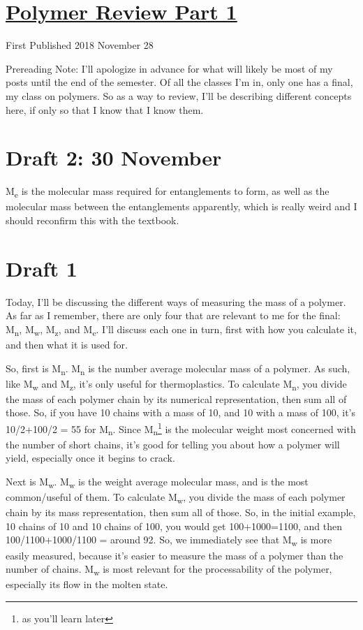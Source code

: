 \documentclass[12pt]{article}[titlepage]
\newcommand{\1}{\={a}}
\newcommand{\2}{\={e}}
\newcommand{\3}{\={\i}}
\newcommand{\4}{\=o}
\newcommand{\5}{\=u}
\newcommand{\6}{\={A}}
\newcommand{\sub}[1]{\textsubscript{#1}}
\renewcommand{\,}{\textsuperscript{,}}
\begin{document}
\doublespacing
\section{\href{polymer-1.html}{Polymer Review Part 1}}
First Published 2018 November 28

Prereading Note: I'll apologize in advance for what will likely be most of my posts until the end of the semester.
Of all the classes I'm in, only one has a final, my class on polymers.
So as a way to review, I'll be describing different concepts here, if only so that I know that I know them.
\section{Draft 2: 30 November}
M\sub{e} is the molecular mass required for entanglements to form, as well as the molecular mass between the entanglements apparently, which is really weird and I should reconfirm this with the textbook.
\section{Draft 1}
Today, I'll be discussing the different ways of measuring the mass of a polymer.
As far as I remember, there are only four that are relevant to me for the final: M\sub{n}, M\sub{w}, M\sub{z}, and M\sub{e}.
I'll discuss each one in turn, first with how you calculate it, and then what it is used for.

So, first is M\sub{n}.
M\sub{n} is the number average molecular mass of a polymer.
As such, like M\sub{w} and M\sub{z}, it's only useful for thermoplastics.
To calculate M\sub{n}, you divide the mass of each polymer chain by its numerical representation, then sum all of those.
So, if you have 10 chains with a mass of 10, and 10 with a mass of 100, it's 10/2+100/2 = 55 for M\sub{n}.
Since M\sub{n}\footnote{as you'll learn later} is the molecular weight most concerned with the number of short chains, it's good for telling you about how a polymer will yield, especially once it begins to crack.

Next is M\sub{w}.
M\sub{w} is the weight average molecular mass, and is the most common/useful of them.
To calculate M\sub{w}, you divide the mass of each polymer chain by its mass representation, then sum all of those.
So, in the initial example, 10 chains of 10 and 10 chains of 100, you would get 100+1000=1100, and then 100/1100+1000/1100 = around 92.
So, we immediately see that M\sub{w} is more easily measured, because it's easier to measure the mass of a polymer than the number of chains.
M\sub{w} is most relevant for the processability of the polymer, especially its flow in the molten state.
\end{document}
